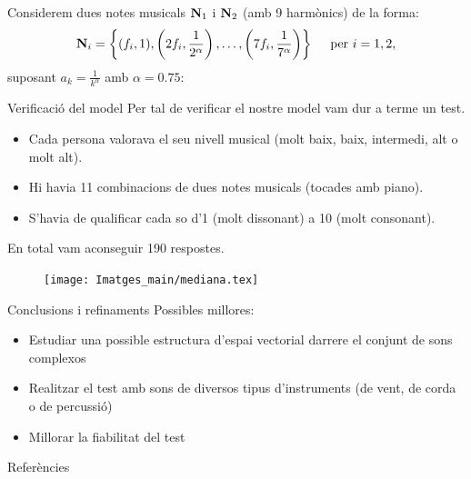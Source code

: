\documentclass[10pt,hyperref={colorlinks,linkcolor=black,citecolor=blue!80,urlcolor=blue!60},handout]{beamer} %
\theoremstyle{definition}
\newcommand{\0}{\ensuremath{\vb{0}}}
\newcommand{\N}{\ensuremath{\vb{N}}}
\begin{document}
\begin{frame}
    Considerem dues notes musicals $\N_1$ i $\N_2$ (amb 9 harmònics) de la forma: $$\N_i=\left\{(f_i,1),\left(2f_i,\frac{1}{2^\alpha}\right),\ldots,\left(7f_i,\frac{1}{7^\alpha}\right)\right\}\quad\text{ per }i=1,2,$$ suposant $a_k=\frac{1}{k^\alpha}$ amb $\alpha=0.75$:\pause
    \begin{figure}
        \centering
        
    \end{figure}
\end{frame}
\begin{frame}{Verificació del model}
    Per tal de verificar el nostre model vam dur a terme un test. \pause
    \begin{itemize}
        \item Cada persona valorava el seu nivell musical (molt baix, baix, intermedi, alt o molt alt).\pause
        \item Hi havia 11 combinacions de dues notes musicals (tocades amb piano).\pause
        \item S'havia de qualificar cada so d'1 (molt dissonant) a 10 (molt consonant).
    \end{itemize}\pause
    En total vam aconseguir 190 respostes.
    \begin{figure}
        \centering
        \texttt{[image: Imatges\_main/mediana.tex]}
    \end{figure}
\end{frame}
\begin{frame}{Conclusions i refinaments}
    Possibles millores:\pause
    \begin{itemize}
        \item Estudiar una possible estructura d'espai vectorial darrere el conjunt de sons complexos\pause
        \item Realitzar el test amb sons de diversos tipus d'instruments (de vent, de corda o de percussió)\pause
        \item Millorar la fiabilitat del test
    \end{itemize}
\end{frame}
\begin{frame}[noframenumbering]{Referències}
    \printbibliography[heading=none]
\end{frame}
\end{document}
